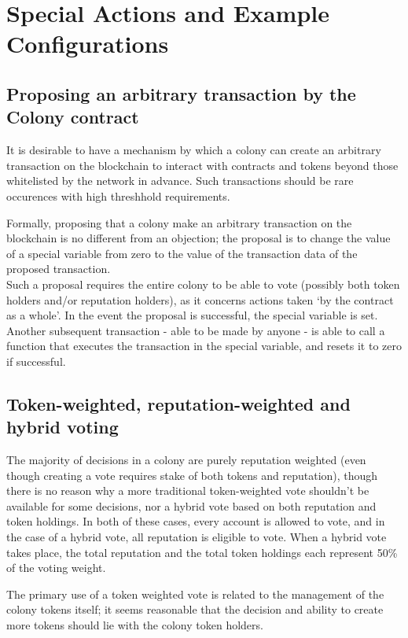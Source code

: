 \section{Special Actions and Example Configurations}\label{sec:special-cases}


\subsection{Proposing an arbitrary transaction by the Colony contract}\label{sec:arbitrary-transaction}
It is desirable to have a mechanism by which a colony can create an arbitrary transaction on the blockchain to interact with contracts and tokens beyond those whitelisted by the network in advance. Such transactions should be rare occurences with high threshhold requirements.

Formally, proposing that a colony make an arbitrary transaction on the blockchain is no different from an objection; the proposal is to change the value of a special variable from zero to the value of the transaction data of the proposed transaction.\\
Such a proposal requires the entire colony to be able to vote (possibly both token holders and/or reputation holders), as it concerns actions taken `by the contract as a whole'. In the event the proposal is successful, the special variable is set. Another subsequent transaction - able to be made by anyone - is able to call a function that executes the transaction in the special variable, and resets it to zero if successful.

\subsection{Token-weighted, reputation-weighted and hybrid voting}
The majority of decisions in a colony are purely reputation weighted (even though creating a vote requires stake of both tokens and reputation), though there is no reason why a more traditional token-weighted vote shouldn't be available for some decisions, nor a hybrid vote based on both reputation and token holdings. In both of these cases, every account is allowed to vote, and in the case of a hybrid vote, all reputation is eligible to vote. When a hybrid vote takes place, the total reputation and the total token holdings each represent 50\% of the voting weight.

The primary use of a token weighted vote is related to the management of the colony tokens itself; it seems reasonable that the decision and ability to create more tokens should lie with the colony token holders.

